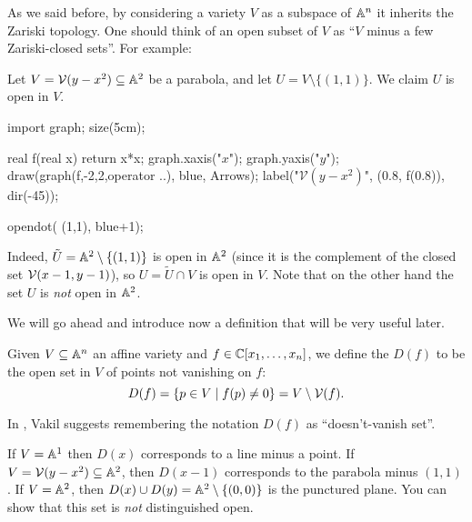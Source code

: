 As we said before, by considering a variety $V$ as a subspace of $\mathbb A^n$
it inherits the Zariski topology.
One should think of an open subset of $V$ as
``$V$ minus a few Zariski-closed sets''.
For example:
\begin{example}
	Let $V = \mathcal V(y-x^2) \subseteq \mathbb A^2$ be a parabola,
	and let $U = V \setminus \{(1,1)\}$. We claim $U$ is open in $V$.
	\begin{center}
		\begin{asy}
		import graph;
		size(5cm);

		real f(real x) { return x*x; }
		graph.xaxis("$x$");
		graph.yaxis("$y$");
		draw(graph(f,-2,2,operator ..), blue, Arrows);
		label("$\mathcal V(y-x^2)$", (0.8, f(0.8)), dir(-45));

		opendot( (1,1), blue+1);
		\end{asy}
	\end{center}
	Indeed, $\tilde U = \mathbb A^2 \setminus \{(1,1)\}$ is open in $\mathbb A^2$
	(since it is the complement of the closed set $\mathcal V(x-1,y-1)$),
	so $U = \tilde U \cap V$ is open in $V$.
	Note that on the other hand the set $U$ is \emph{not} open in $\mathbb A^2$.
\end{example}

We will go ahead and introduce now a definition
that will be very useful later.
\begin{definition}
	Given $V \subseteq \mathbb A^n$ an affine variety and $f \in \mathbb C[x_1, \dots, x_n]$,
	we define the 
	$D(f)$ to be the open set in $V$
	of points not vanishing on $f$:
	\[ D(f) = \left\{ p \in V \mid f(p) \neq 0 \right\} = V \setminus \mathcal V(f). \]
\end{definition}
In \cite{ref:vakil}, Vakil suggests remembering the
notation $D(f)$ as ``doesn't-vanish set''.
\begin{example}
	\listhack
	\begin{enumerate}[(a)]
		\ii If $V = \mathbb A^1$ then $D(x)$ corresponds to a line minus a point.
		\ii If $V = \mathcal V(y-x^2) \subseteq \mathbb A^2$,
		then $D(x-1)$ corresponds to the parabola minus $(1,1)$.
		\ii If $V = \mathbb A^2$, then
		$D(x) \cup D(y) = \mathbb A^2 \setminus \{ (0,0) \}$
		is the punctured plane.
		You can show that this set is \emph{not} distinguished open.
	\end{enumerate}
\end{example}


